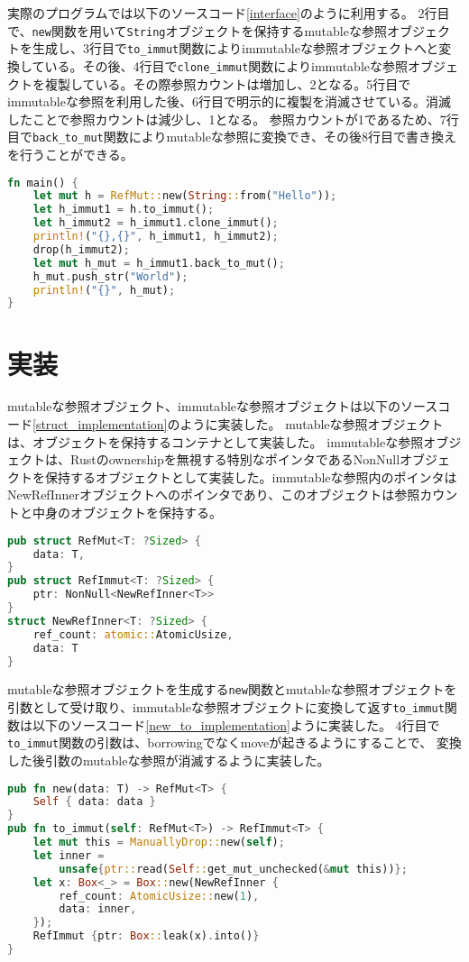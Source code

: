 \documentclass{sumiilab-paper}
\theoremstyle{mystyle}
\numberwithin{definition}{chapter} %
\begin{document}
実際のプログラムでは以下のソースコード\ref{interface}のように利用する。
2行目で、\texttt{new}関数を用いて\texttt{String}オブジェクトを保持するmutableな参照オブジェクトを生成し、3行目で\texttt{to\_immut}関数によりimmutableな参照オブジェクトへと変換している。その後、4行目で\texttt{clone\_immut}関数によりimmutableな参照オブジェクトを複製している。その際参照カウントは増加し、2となる。5行目でimmutableな参照を利用した後、6行目で明示的に複製を消滅させている。消滅したことで参照カウントは減少し、1となる。
参照カウントが1であるため、7行目で\texttt{back\_to\_mut}関数によりmutableな参照に変換でき、その後8行目で書き換えを行うことができる。
\begin{lstlisting}[language=Rust, caption=新たな参照オブジェクトの利用例, label=interface, captionpos=b]
fn main() {
    let mut h = RefMut::new(String::from("Hello"));
    let h_immut1 = h.to_immut();
    let h_immut2 = h_immut1.clone_immut();
    println!("{},{}", h_immut1, h_immut2);
    drop(h_immut2);
    let mut h_mut = h_immut1.back_to_mut();
    h_mut.push_str("World");
    println!("{}", h_mut);
}
\end{lstlisting}

\section{実装}
mutableな参照オブジェクト、immutableな参照オブジェクトは以下のソースコード\ref{struct_implementation}のように実装した。
mutableな参照オブジェクトは、オブジェクトを保持するコンテナとして実装した。
immutableな参照オブジェクトは、Rustのownershipを無視する特別なポインタであるNonNullオブジェクトを保持するオブジェクトとして実装した。immutableな参照内のポインタはNewRefInnerオブジェクトへのポインタであり、このオブジェクトは参照カウントと中身のオブジェクトを保持する。
\begin{lstlisting}[language=Rust, caption=新たな参照オブジェクトの実装, label=struct_implementation, captionpos=b]
pub struct RefMut<T: ?Sized> {
    data: T,
}
pub struct RefImmut<T: ?Sized> {
    ptr: NonNull<NewRefInner<T>>
}
struct NewRefInner<T: ?Sized> {
    ref_count: atomic::AtomicUsize,
    data: T
}
\end{lstlisting}

mutableな参照オブジェクトを生成する\texttt{new}関数とmutableな参照オブジェクトを引数として受け取り、immutableな参照オブジェクトに変換して返す\texttt{to\_immut}関数は以下のソースコード\ref{new_to_implementation}ように実装した。
4行目で\texttt{to\_immut}関数の引数は、borrowingでなくmoveが起きるようにすることで、
変換した後引数のmutableな参照が消滅するように実装した。
\begin{lstlisting}[language=Rust, caption=関数newと関数to\_immutの実装, label=new_to_implementation, captionpos=b]
pub fn new(data: T) -> RefMut<T> {
    Self { data: data }
}
pub fn to_immut(self: RefMut<T>) -> RefImmut<T> {
    let mut this = ManuallyDrop::new(self);
    let inner =
        unsafe{ptr::read(Self::get_mut_unchecked(&mut this))};
    let x: Box<_> = Box::new(NewRefInner {
        ref_count: AtomicUsize::new(1),
        data: inner,
    });
    RefImmut {ptr: Box::leak(x).into()}
}
\end{lstlisting}
\end{document}
